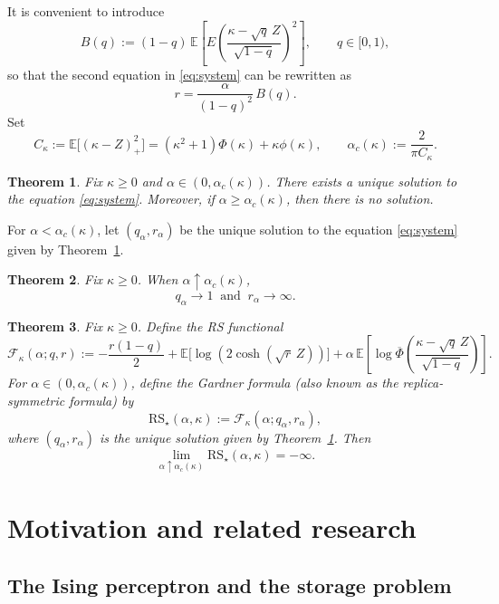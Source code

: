 \documentclass[11pt]{article}
\newtheorem{theorem}{Theorem}
\begin{document}
It is convenient to introduce
\begin{equation}\label{eq:defB}
B(q):=(1-q)\,\mathbb E\left[E\!\left(\frac{\kappa-\sqrt{q}\,Z}{\sqrt{1-q}}\right)^2\right],\qquad q\in[0,1),
\end{equation}
so that the second equation in \eqref{eq:system} can be rewritten as
\begin{equation}\label{eq:r_in_terms_of_B}
r=\frac{\alpha}{(1-q)^2}\,B(q).
\end{equation}
Set
\[
C_{\kappa}:=\mathbb E\big[(\kappa-Z)_+^2\big]=(\kappa^2+1)\Phi(\kappa)+\kappa\phi(\kappa),
\qquad
\alpha_c(\kappa):=\frac{2}{\pi C_{\kappa}}.
\]

\begin{theorem}\label{thm:main}
Fix $\kappa\geq 0$ and $\alpha\in (0,\alpha_c(\kappa))$. There exists a unique solution to the equation \eqref{eq:system}. Moreover, if $\alpha\ge \alpha_c(\kappa)$, then there is no solution.
\end{theorem}
For $\alpha<\alpha_c(\kappa)$, let $(q_\alpha,r_\alpha)$ be the unique solution to the equation \eqref{eq:system} given by Theorem~\ref{thm:main}.
\begin{theorem}\label{thm:2ndmain}
Fix $\kappa\geq 0$. When $\alpha\uparrow\alpha_c(\kappa)$, \[
q_\alpha\to 1
\ \text{ and }\ 
r_\alpha\to\infty.
\]
\end{theorem}
\begin{theorem}\label{thm: bound for threshold}
Fix $\kappa\geq 0$. 
 Define the RS functional
\begin{equation}\label{eq:RSfunctional}
\mathcal F_\kappa(\alpha;q,r)
:=
-\frac{r(1-q)}{2}
+\mathbb E\big[\log(2\cosh(\sqrt r\,Z))\big]
+\alpha\,\mathbb E\!\left[\log \overline\Phi\!\left(\frac{\kappa-\sqrt q\,Z}{\sqrt{1-q}}\right)\right].
\end{equation}
For $\alpha\in(0,\alpha_c(\kappa))$, define the Gardner formula (also known as the replica-symmetric formula) by $$\mathrm{RS}_\star(\alpha,\kappa):=\mathcal F_\kappa(\alpha;q_\alpha,r_\alpha),$$
where $(q_\alpha,r_\alpha)$ is the unique solution given by Theorem~\ref{thm:main}. Then
\[
\lim_{\alpha\uparrow\alpha_c(\kappa)} \mathrm{RS}_\star(\alpha,\kappa)=-\infty.
\]
\end{theorem}
\section{Motivation and related research}

\subsection{The Ising perceptron and the storage problem}
\end{document}
